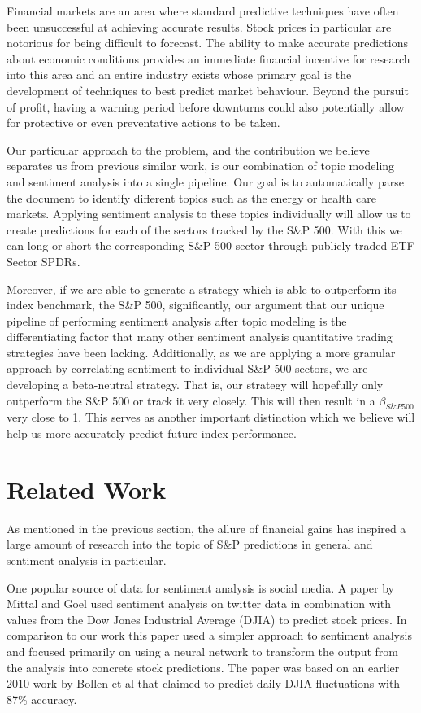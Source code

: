 \documentclass{sig-alternate-05-2015}
\begin{document}
Financial markets are an area where standard
predictive techniques have often been unsuccessful at achieving
accurate results. Stock prices in particular are notorious
for being difficult to forecast. The ability to make accurate 
predictions about economic conditions provides an immediate 
financial incentive for research into this area and an entire 
industry exists whose primary goal is the development of 
techniques to best predict market behaviour. Beyond the pursuit of
profit, having a warning period before downturns could 
also potentially allow for protective or even preventative 
actions to be taken. 

Our particular approach to the problem, and the contribution we 
believe separates us from previous similar work, is our combination
of topic modeling and sentiment analysis into a single pipeline. Our
goal is to automatically parse the document to identify different
topics such as the energy or health care markets. Applying
sentiment analysis to these topics individually will allow us to create
predictions for each of the sectors tracked by the S\&P 500. With this we can long or short the corresponding S\&P 500 sector through publicly traded ETF Sector SPDRs.

Moreover, if we are able to generate a strategy which is able to outperform its index benchmark, the S\&P 500, significantly, our argument that our unique pipeline of performing sentiment analysis after topic modeling is the differentiating factor that many other sentiment analysis quantitative trading strategies have been lacking. Additionally, as we are applying a more granular approach by correlating sentiment to individual S\&P 500 sectors, we are developing a beta-neutral strategy. That is, our strategy will hopefully only outperform the S\&P 500 or track it very closely. This will then result in a $\beta_{S\&P 500}$ very close to 1. This serves as another important distinction which we believe will help us more accurately predict future index performance. 

\section{Related Work}
As mentioned in the previous section, the allure of financial gains
has inspired a large amount of research into the topic of S\&P predictions
in general and sentiment analysis in particular. 

One popular source of data for sentiment analysis is social media. A paper
by Mittal and Goel used sentiment analysis on twitter data in combination
with values from the Dow Jones Industrial Average (DJIA) to predict stock prices.
In comparison to our work this paper used a simpler approach to sentiment
analysis and focused primarily on using a neural network to transform the
output from the analysis into concrete stock predictions. The paper was based
on an earlier 2010 work by Bollen et al that claimed to predict daily DJIA 
fluctuations with 87\% accuracy.\cite{bollen:twitter}
\end{document}
